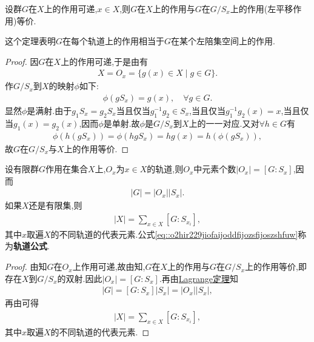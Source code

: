 \documentclass[../../main.tex]{subfiles}%
\begin{document}
\begin{theorem}\label{theorem:抽象代数--定理4.2.3}
设群$G$在$X$上的作用可递,$x \in X$,则$G$在$X$上的作用与$G$在$G/S_x$上的作用(左平移作用)等价.
\end{theorem}
\begin{remark}
这个定理表明$G$在每个轨道上的作用相当于$G$在某个左陪集空间上的作用.
\end{remark}
\begin{proof}

因$G$在$X$上的作用可递,于是由有
\begin{align*}
X = O_x = \{g(x)\in X \mid g \in G\}.
\end{align*}
作$G/S_x$到$X$的映射$\phi$如下:
\begin{align*}
\phi(gS_x) = g(x), \quad \forall g \in G.
\end{align*}
显然$\phi$是满射.由于$g_1S_x = g_2S_x$当且仅当$g_1^{-1}g_2 \in S_x$,当且仅当$g_1^{-1}g_2(x) = x$,当且仅当$g_1(x) = g_2(x)$,因而$\phi$是单射.故$\phi$是$G/S_x$到$X$上的一一对应.又对$\forall h \in G$有
\begin{align*}
\phi(h(gS_x)) = \phi(hgS_x) = hg(x) = h(\phi(gS_x)),
\end{align*}
故$G$在$G/S_x$与$X$上的作用等价.

\end{proof}

\begin{corollary}[轨道公式]\label{corollary:有限群轨道的阶与其商掉迷向子群的阶相同}
设有限群$G$作用在集合$X$上,$O_x$为$x \in X$的轨道,则$O_x$中元素个数$|O_x| = [G: S_x]$,因而
\begin{align*}
|G|=\left|O_x \right|\left| S_x \right|.
\end{align*}
如果$X$还是有限集,则
\begin{align}\label{eq::o2hir229jiofaijoddfijozsfijoszshfuw}
|X|=\sum_{x\in X}[G:S_{x_i}],
\end{align}
其中$x$取遍$X$的不同轨道的代表元素.公式\eqref{eq::o2hir229jiofaijoddfijozsfijoszshfuw}称为\textbf{轨道公式}.
\end{corollary}
\begin{proof}

由知$G$在$O_x$上作用可递,故由知,$G$在$X$上的作用与$G$在$G/S_x$上的作用等价,即存在$X$到$G/S_x$的双射.因此$|O_x| = [G: S_x]$.再由\hyperref[theorem:抽象代数--Lagrange定理]{Lagrange定理}知
\begin{align*}
\left| G \right|=\left[ G:S_x \right] \left| S_x \right|=\left| O_x \right|\left| S_x \right|,
\end{align*}
再由可得
\begin{align*}
|X|=\sum_{x\in X}[G:S_{x_i}],
\end{align*}
其中$x$取遍$X$的不同轨道的代表元素.

\end{proof}
\end{document}
